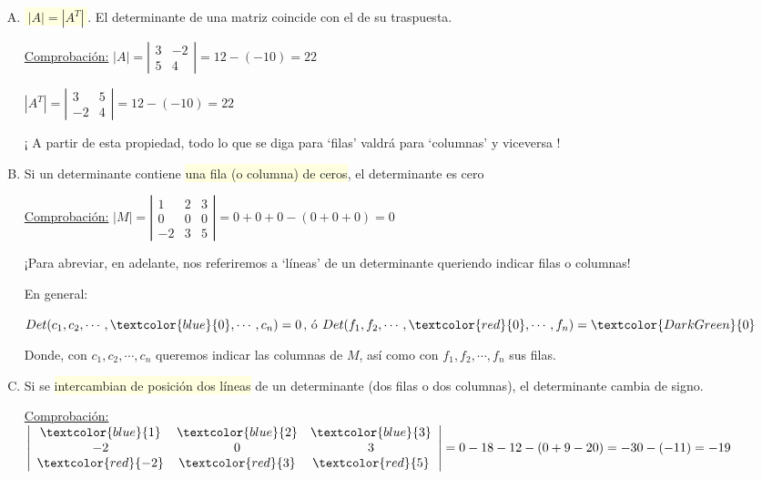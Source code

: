 \begin{enumerate}[P.D. 1]
\item \colorbox{LightYellow}{$\boxed{\; |A|=|A^T|\; }$}. El determinante de una matriz coincide con el de su traspuesta.

\underline{Comprobación:}  $|A|=\left | \begin{array}{cc} 3&-2\\5&4  \end{array} \right| = 12-(-10)=22$

$|A^T|=\left | \begin{array}{cc} 3&5\\-2&4  \end{array} \right| = 12-(-10)=22$

¡ A partir de esta propiedad, todo lo que se diga para `filas' valdrá para `columnas' y viceversa !

\item Si un determinante contiene \colorbox{LightYellow}{una fila (o columna) de ceros}, el determinante es cero

\underline{Comprobación:} $|M|=\left| \begin{array}{ccc} 1&2&3\\0&0&0\\-2&3&5 \end{array} \right|= 0+0+0-(0+0+0)=0$

¡Para abreviar, en adelante, nos referiremos a `líneas' de un determinante queriendo indicar filas o columnas!

En general:

 $Det(c_1, c_2, \cdots, \textcolor{blue}{0}, \cdots , c_n)=0$, ó  $Det(f_1, f_2, \cdots, \textcolor{red}{0}, \cdots , f_n)=\textcolor{DarkGreen}{0}$
 
 Donde, con $c_1, c_2, \cdots, c_n$ queremos indicar las columnas de $M$, así como con $f_1,f_2, \cdots , f_n$ sus filas.

\item Si se \colorbox{LightYellow}{intercambian de posición dos líneas} de un determinante (dos filas o dos columnas), el determinante cambia de signo.

\underline{Comprobación:}  $\left| \begin{array}{ccc} \textcolor{blue}{1}& \textcolor{blue}{2}& \textcolor{blue}{3}\\-2&0&3\\ \textcolor{red}{-2}& \textcolor{red}{3}& \textcolor{red}{5} \end{array} \right|= 
0-18-12-(0+9-20)=-30-(-11)=-19$


\end{enumerate}
